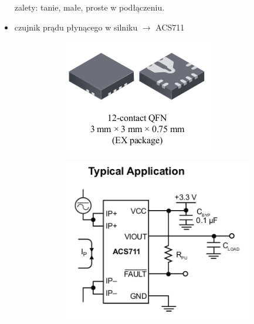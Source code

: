 \documentclass[8pt]{beamer}
\begin{document}
\begin{frame}[allowframebreaks]
\begin{itemize}
			zalety: tanie, małe, proste w podłączeniu.
		\item czujnik prądu płynącego w silniku $\rightarrow$ ACS711
		\begin{figure}
				\begin{center}
        			\begin{subfigure}[b]{0.15\textwidth}
                		\includegraphics[width=\textwidth]{graphics/acs711.png}
                		\label{graph:g5}
        			\end{subfigure}\hspace{2cm}
        			\begin{subfigure}[b]{0.3\textwidth}
                		\includegraphics[width=\textwidth]{graphics/acs711_app.png}
                		\label{graph:g6}
        			\end{subfigure}%
				\end{center}
			\end{figure}
			
		
	\end{itemize}
\end{frame}
\end{document}
